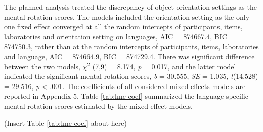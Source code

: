 \documentclass[
  man]{apa7}
\begin{document}
The planned analysis treated the discrepancy of object orientation settings as the mental rotation scores. The models included the orientation setting as the only one fixed effect converged at all the random intercepts of participants, items, laboratories and orientation setting on languages, AIC = 874667.4, BIC = 874750.3, rather than at the random intercepts of participants, items, laboratories and language, AIC = 874664.9, BIC = 874729.4. There was significant difference between the two models, \({\chi}^2\) (7,9) = 8.174, \emph{p} = 0.017, and the latter model indicated the significant mental rotation scores, \emph{b} = 30.555, \emph{SE} = 1.035, \emph{t}(14.528) = 29.516, \emph{p} \textless{} .001. The coefficients of all considered mixed-effects models are reported in Appendix 5. Table \ref{tab:lme-coef} summarized the language-specific mental rotation scores estimated by the mixed-effect models.

(Insert Table \ref{tab:lme-coef} about here)
\end{document}
